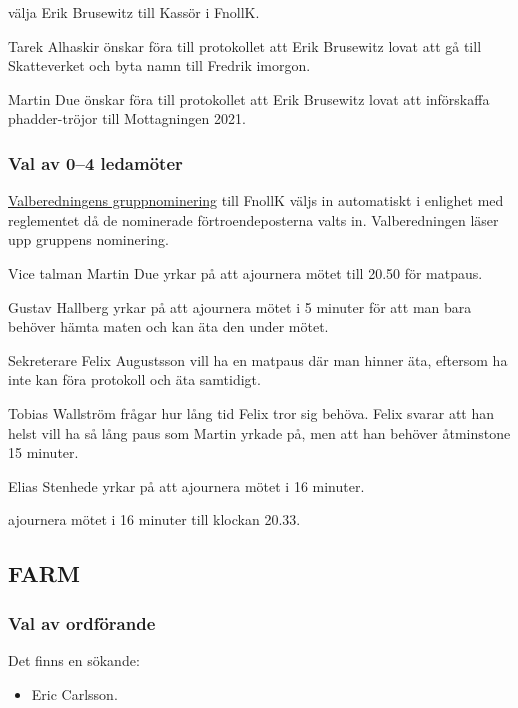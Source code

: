 \documentclass[hidelinks]{sektionsmote} %
\begin{document}
\begin{beslut}
  \item välja Erik Brusewitz till Kassör i FnollK.
\end{beslut}
Tarek Alhaskir önskar föra till protokollet att Erik Brusewitz lovat att gå till Skatteverket och byta namn till Fredrik imorgon.\par
Martin Due önskar föra till protokollet att Erik Brusewitz lovat att införskaffa phadder-tröjor till Mottagningen 2021.

\subsubsection{Val av 0--4 ledamöter}
\hyperlink{bilagor/nomfnollk.pdf.1}{Valberedningens gruppnominering} till FnollK väljs in automatiskt i enlighet med reglementet då de nominerade förtroendeposterna valts in.
Valberedningen läser upp gruppens nominering.

\begin{ofraga}
  Vice talman Martin Due yrkar på att ajournera mötet till 20.50 för matpaus.\par
  Gustav Hallberg yrkar på att ajournera mötet i 5 minuter för att man bara behöver hämta maten och kan äta den under mötet.\par
  Sekreterare Felix Augustsson vill ha en matpaus där man hinner äta, eftersom ha inte kan föra protokoll och äta samtidigt.\par
  Tobias Wallström frågar hur lång tid Felix tror sig behöva.
  Felix svarar att han helst vill ha så lång paus som Martin yrkade på, men att han behöver åtminstone 15 minuter.\par
  Elias Stenhede yrkar på att ajournera mötet i 16 minuter.
  \begin{beslut}
    \item ajournera mötet i 16 minuter till klockan 20.33.
  \end{beslut}
\end{ofraga}

\subsection{FARM}
\subsubsection{Val av ordförande}
Det finns en sökande:
\begin{itemize}
    \item Eric Carlsson.
\end{itemize}
\end{document}
